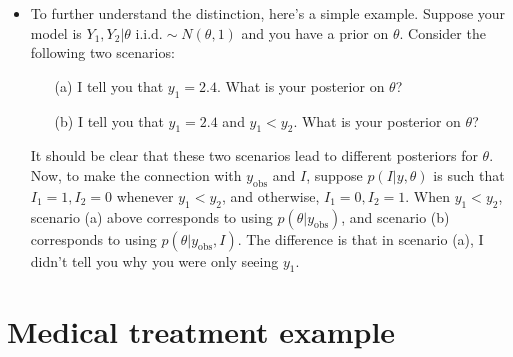 \documentclass[12pt]{article}
\begin{document}
\begin{itemize}
\item To further understand the distinction, here's a simple example.  Suppose your model is $Y_1,Y_2|\theta \text{ i.i.d.}\sim N(\theta,1)$ and you have a prior on $\theta$. Consider the following two scenarios:
\begin{enumerate}
\item[(a)] I tell you that $y_1 = 2.4$. What is your posterior on $\theta$?
\item[(b)] I tell you that $y_1 = 2.4$ and $y_1 < y_2$. What is your posterior on $\theta$?
\end{enumerate}
It should be clear that these two scenarios lead to different posteriors for $\theta$. Now, to make the connection with $y_\text{obs}$ and $I$, suppose $p(I|y,\theta)$ is such that $I_1=1,I_2=0$ whenever $y_1 < y_2$, and otherwise, $I_1=0,I_2=1$. When $y_1 < y_2$, scenario (a) above corresponds to using $p(\theta | y_\text{obs})$, and scenario (b) corresponds to using $p(\theta | y_\text{obs}, I)$. The difference is that in scenario (a), I didn't tell you why you were only seeing $y_1$.
\end{itemize}



\section{Medical treatment example}
\end{document}
